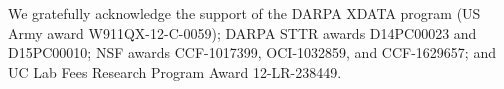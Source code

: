 \documentclass[format=acmsmall,review=false,screen=true]{acmart}
\begin{document}
We gratefully acknowledge the support of the DARPA XDATA program (US
Army award W911QX-12-C-0059); DARPA STTR awards D14PC00023 and
D15PC00010; NSF awards CCF-1017399, OCI-1032859, and CCF-1629657; and
UC Lab Fees Research Program Award 12-LR-238449.



\end{document}
